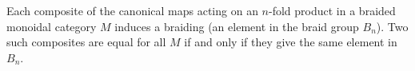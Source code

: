 \begin{theorem}
Each composite of the canonical maps acting on an $n$-fold product in a braided monoidal category $M$ induces a braiding (an element in the braid group $B_n$). Two such composites are equal for all $M$ if and only if they give the same element in $B_n$.
\end{theorem}
